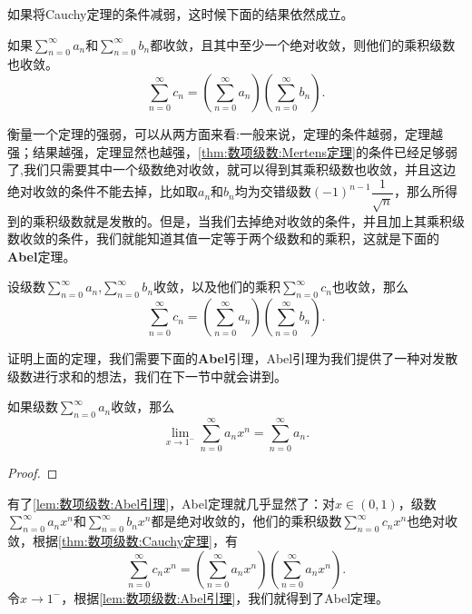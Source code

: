 如果将Cauchy定理的条件减弱，这时候下面的结果依然成立。
\begin{theorem}[Mertens]\label{thm:数项级数:Mertens定理}
    如果\(\sum\limits_{n=0}^{\infty}a_n\)和\(\sum\limits_{n=0}^{\infty}b_n\)都收敛，且其中至少一个绝对收敛，则他们的乘积级数也收敛。\[\sum_{n=0}^{\infty}c_n=\left(\sum_{n=0}^{\infty}a_n\right)\left(\sum_{n=0}^{\infty}b_n\right).\]
\end{theorem}

衡量一个定理的强弱，可以从两方面来看:一般来说，定理的条件越弱，定理越强；结果越强，定理显然也越强，\enspace \autoref{thm:数项级数:Mertens定理}的条件已经足够弱了,我们只需要其中一个级数绝对收敛，就可以得到其乘积级数也收敛，并且这边绝对收敛的条件不能去掉，比如取\(a_n\)和\(b_n\)均为交错级数\((-1)^{n-1}\dfrac{1}{\sqrt{n}}\)，那么所得到的乘积级数就是发散的。但是，当我们去掉绝对收敛的条件，并且加上其乘积级数收敛的条件，我们就能知道其值一定等于两个级数和的乘积，这就是下面的{\heiti \textbf{Abel}定理}。

\begin{theorem}[Abel定理]
    设级数\(\sum\limits_{n=0}^{\infty}a_n\),\enspace \(\sum\limits_{n=0}^{\infty}b_n\)收敛，以及他们的乘积\(\sum\limits_{n=0}^{\infty}c_n\)也收敛，那么\[\sum_{n=0}^{\infty}c_n = \left(\sum_{n = 0}^{\infty}a_n\right)\left(\sum_{n = 0}^{\infty}b_n\right).\]
\end{theorem}

证明上面的定理，我们需要下面的\textbf{Abel}{\heiti 引理}，Abel引理为我们提供了一种对发散级数进行求和的想法，我们在下一节中就会讲到。

\begin{lemma}[Abel引理]\label{lem:数项级数:Abel引理}
    如果级数\(\sum\limits_{n=0}^{\infty}a_n\)收敛，那么\[\lim_{x\to 1^-}\sum_{n=0}^{\infty}a_nx^n = \sum_{n=0}^{\infty}a_n.\]
\end{lemma}

\begin{proof}
    
\end{proof}

有了\autoref{lem:数项级数:Abel引理}，\enspace Abel定理就几乎显然了：对\(x\in(0,1)\)，级数\(\sum\limits_{n=0}^{\infty}a_nx^n\)和\(\sum\limits_{n=0}^{\infty}b_nx^n\)都是绝对收敛的，他们的乘积级数\(\sum\limits_{n=0}^{\infty}c_nx^n\)也绝对收敛，根据\autoref{thm:数项级数:Cauchy定理}，有\[\sum_{n=0}^{\infty}c_nx^n=\left(\sum_{n=0}^{\infty}a_nx^n\right)\left(\sum_{n=0}^{\infty}a_nx^n\right).\]
令\(x\to1^-\)，根据\autoref{lem:数项级数:Abel引理}，我们就得到了Abel定理。

